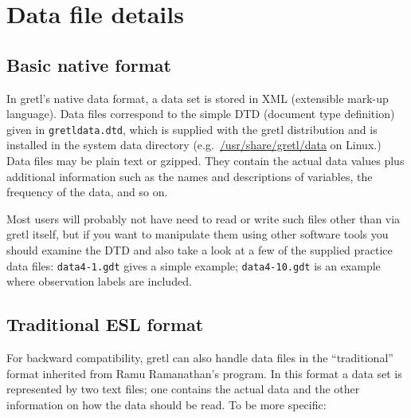 \chapter{Data file details}
\label{app-datafile}

\section{Basic native format}
\label{native}

In gretl's native data format, a data set is stored in XML
(extensible mark-up language). Data files correspond to the simple DTD
(document type definition) given in \verb+gretldata.dtd+, which is
supplied with the gretl distribution and is installed in the
system data directory (e.g.\ \url{/usr/share/gretl/data} on Linux.)
Data files may be plain text or gzipped.  They contain the actual data
values plus additional information such as the names and descriptions
of variables, the frequency of the data, and so on.

Most users will probably not have need to read or write such files
other than via gretl itself, but if you want to manipulate them
using other software tools you should examine the DTD and also take a
look at a few of the supplied practice data files: \verb+data4-1.gdt+
gives a simple example; \verb+data4-10.gdt+ is an example where
observation labels are included.

\section{Traditional ESL format}
\label{traddata}

For backward compatibility, gretl can also handle data files in
the ``traditional'' format inherited from Ramu Ramanathan's 
program.  In this format a data set is represented by two text files;
one contains the actual data and the other information on how the data
should be read.  To be more specific:

